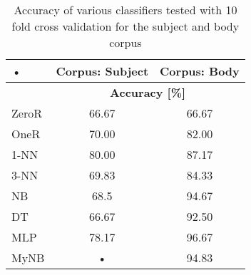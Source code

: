 \documentclass[10pt, a4paper]{article}
\begin{document}

\begin{table}[H]
\centering
\caption{Accuracy of various classifiers tested with 10 fold cross validation for the subject and body corpus}\vspace{1em}
\begin{tabular}{|l||c|c|}
\hline
• & \textbf{Corpus: Subject} & \textbf{Corpus: Body} \\
\hline
& \multicolumn{2}{c|}{\textbf{Accuracy [\%]}} \\
\hline\hline
ZeroR & 66.67 & 66.67 \\
\hline
OneR & 70.00 & 82.00 \\
\hline
1-NN & 80.00 & 87.17 \\
\hline
3-NN & 69.83 & 84.33 \\
\hline
NB & 68.5 & 94.67 \\
\hline
DT & 66.67 & 92.50 \\
\hline
MLP & 78.17 & 96.67 \\
\hline
MyNB & • & 94.83 \\
\hline
\end{tabular}
\label{table:results}
\end{table}
\end{document}
